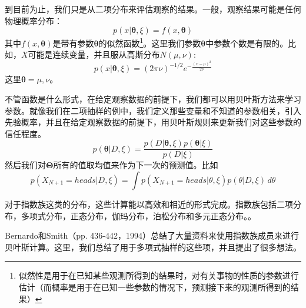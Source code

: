 \documentclass[10pt,a4paper]{article}
\begin{document}
\begin{CJK*}{UTF8}{gkai}
到目前为止，我们只是从二项分布来评估观察的结果。一般，观察结果可能是任何物理概率分布：
\begin{equation}
p(x|\boldsymbol{\theta},\xi)=f(x,\boldsymbol{\theta}) \nonumber
\end{equation}
其中$f(x,\boldsymbol{\theta})$是带有参数$\boldsymbol{\theta}$的似然函数\footnote{似然性是用于在已知某些观测所得到的结果时，对有关事物的性质的参数进行估计（而概率是用于在已知一些参数的情况下，预测接下来的观测所得到的结果）}。这里我们参数$\boldsymbol{\theta}$中参数个数是有限的。比如，$X$可能是连续变量，并且服从高斯分布$N(\mu,\nu)$:
\begin{equation}
p(x|\boldsymbol{\theta},\xi)=(2\pi \nu)^{-1/2}e^{-\frac{(x-\mu)^2}{2\nu}} \nonumber
\end{equation}
这里$\boldsymbol{\theta}={\mu,\nu}$。


不管函数是什么形式，在给定观察数据的前提下，我们都可以用贝叶斯方法来学习参数。就像我们在二项抽样的例中，我们定义那些变量和不知道的参数相关，引入先验概率，并且在给定观察数据的前提下，用贝叶斯规则来更新我们对这些参数的信任程度。
\begin{equation}
p(\boldsymbol{\theta}|D,\xi)=
\frac{p(D|\boldsymbol{\theta},\xi)p(\boldsymbol{\theta}|\xi)}{p(D|\xi)}
\end{equation}
然后我们对$\boldsymbol{\Theta}$所有的值取均值来作为下一次的预测值。比如
\begin{equation}
p(X_{N+1}=heads|D,\xi)
=\int p(X_{N+1}=heads|\theta,\xi)p(\theta|D,\xi)\, d\theta 
\end{equation}


对于指数族这类的分布，这些计算能以高效和相近的形式完成。指数族包括二项分布，多项式分布，正态分布，伽玛分布，泊松分布和多元正态分布。。


Bernardo和Smith（pp. 436-442，1994）总结了大量资料来使用指数族成员来进行贝叶斯计算。这里，我们总结了用于多项式抽样的这些项，并且提出了很多想法。



\end{CJK*}
\end{document}
